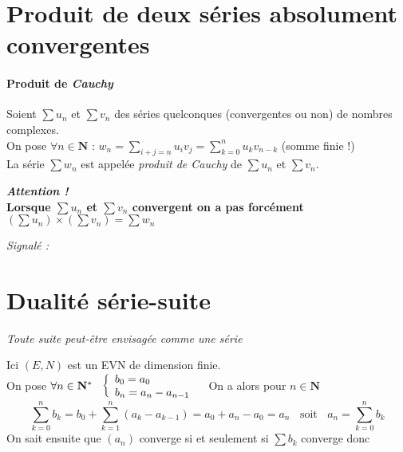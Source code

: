 \section{Produit de deux séries absolument convergentes}

		\vspace{-15pt}
		\traitd
		\paragraph{Produit de \emph{Cauchy}}
			Soient $\sum u_n$ et $\sum v_n$ des séries quelconques (convergentes ou non) de nombres complexes.\\
			On pose $\forall n \in \mathbf{N}$ : $w_n = \sum\limits_{i+j=n} u_i v_j = \sum_{k=0}^{n} u_k v_{n-k}$ (somme finie !) \\
			La série $\sum w_n$ est appelée \emph{produit de \emph{Cauchy}} de $\sum u_n$ et $\sum v_n$.
		\trait
				
		\textbf{\emph{Attention !} \\Lorsque $\sum u_n$ et $\sum v_n$ convergent on a pas forcément 
			$\left(\sum u_n \right) \times \left(\sum v_n \right) = \sum w_n$} \medskip \\
		
		 \medskip

		\textit{\small Signalé :}

		 \medskip
		

	\section{Dualité série-suite}
		
		\textit{Toute suite peut-être envisagée comme une série}
			
		Ici $(E,N)$ est un EVN de dimension finie.\\${}$ \\On pose $\forall n\in\mathbf{N}^* ~~ \left\{ \begin{array}{l}  b_0 = a_0 \\ b_n = a_n - a_{n-1} \end{array}
			\right.~~$ On a alors pour $n\in \mathbf{N}$ \\
			\[ \sum_{k=0}^{n} b_k = b_0 + \sum_{k=1}^{n} (a_k - a_{k-1} ) = a_0 +a_n - a_0 = a_n ~~~~\mathrm{soit} ~~~~ a_n = \sum_{k=0}^{n} b_k\]
			On sait ensuite que $(a_n)$ converge si et seulement si $\sum b_k$ converge donc 
			
		\begin{center}
		\end{center} \medskip
		

\fin